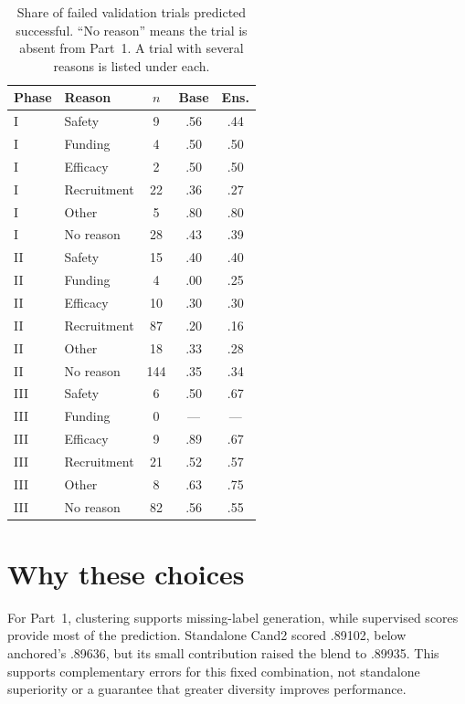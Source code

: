 \documentclass[10pt,twocolumn,letterpaper]{article}
\begin{document}
\begin{table}[t]
\centering\small
\setlength{\tabcolsep}{3pt}
\begin{tabular*}{\columnwidth}{@{\extracolsep{\fill}}llccc@{}}
\toprule
Phase & Reason & $n$ & Base & Ens. \\
\midrule
I & Safety & 9 & .56 & .44 \\
I & Funding & 4 & .50 & .50 \\
I & Efficacy & 2 & .50 & .50 \\
I & Recruitment & 22 & .36 & .27 \\
I & Other & 5 & .80 & .80 \\
I & No reason & 28 & .43 & .39 \\
II & Safety & 15 & .40 & .40 \\
II & Funding & 4 & .00 & .25 \\
II & Efficacy & 10 & .30 & .30 \\
II & Recruitment & 87 & .20 & .16 \\
II & Other & 18 & .33 & .28 \\
II & No reason & 144 & .35 & .34 \\
III & Safety & 6 & .50 & .67 \\
III & Funding & 0 & --- & --- \\
III & Efficacy & 9 & .89 & .67 \\
III & Recruitment & 21 & .52 & .57 \\
III & Other & 8 & .63 & .75 \\
III & No reason & 82 & .56 & .55 \\
\bottomrule
\end{tabular*}
\caption{Share of failed validation trials predicted successful. ``No reason''
means the trial is absent from Part~1. A trial with several reasons is listed
under each.}
\label{tab:err}
\end{table}

\section{Why these choices}
\label{sec:why}

For Part~1, clustering supports missing-label generation, while supervised
scores provide most of the prediction. Standalone Cand2 scored .89102, below
anchored's .89636, but its small contribution raised the blend to .89935.
This supports complementary errors for this fixed combination, not standalone
superiority or a guarantee that greater diversity improves performance.
\end{document}
